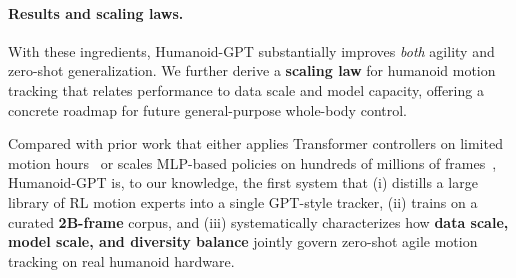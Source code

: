 \paragraph{Results and scaling laws.}
With these ingredients, Humanoid-GPT substantially improves \emph{both} agility and zero-shot generalization. We further derive a \textbf{scaling law} for humanoid motion tracking that relates performance to data scale and model capacity, offering a concrete roadmap for future general-purpose whole-body control.

Compared with prior work that either applies Transformer controllers on limited motion hours~\cite{humanplus24} or scales MLP-based policies on hundreds of millions of frames~\cite{sonic25}, Humanoid-GPT is, to our knowledge, the first system that (i) distills a large library of RL motion experts into a single GPT-style tracker, (ii) trains on a curated \textbf{2B-frame} corpus, and (iii) systematically characterizes how \textbf{data scale, model scale, and diversity balance} jointly govern zero-shot agile motion tracking on real humanoid hardware.
